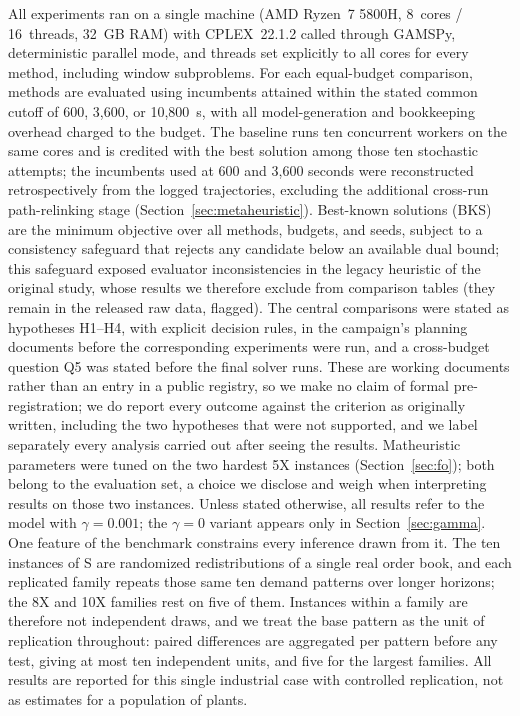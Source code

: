 All experiments ran on a single machine (AMD Ryzen~7 5800H, 8~cores /
16~threads, 32~GB RAM) with CPLEX~22.1.2 called through GAMSPy,
deterministic parallel mode, and threads set explicitly to all cores
for every method, including window subproblems. For each equal-budget
comparison, methods are evaluated using incumbents attained within the
stated common cutoff of 600, 3{,}600, or 10{,}800~s, with all
model-generation and bookkeeping overhead charged to the budget. The
\ILS{} baseline runs ten concurrent workers on the same cores and is
credited with the best solution among those ten stochastic attempts;
the incumbents used at 600 and 3{,}600 seconds were reconstructed
retrospectively from the logged trajectories, excluding the additional
cross-run path-relinking stage (Section~\ref{sec:metaheuristic}).
Best-known solutions (BKS) are
the minimum objective over all methods, budgets, and seeds, subject
to a consistency safeguard that rejects any candidate below an
available dual bound; this safeguard exposed evaluator
inconsistencies in the legacy heuristic of the original study, whose
results we therefore exclude from comparison tables (they remain in
the released raw data, flagged). The central comparisons were stated
as hypotheses H1--H4, with explicit decision rules, in the campaign's
planning documents before the corresponding experiments were run, and
a cross-budget question Q5 was stated before the final solver runs.
These are working documents rather than an entry in a public
registry, so we make no claim of formal pre-registration; we do report
every outcome against the criterion as originally written, including
the two hypotheses that were not supported, and we label separately
every analysis carried out after seeing the results. Matheuristic
parameters were tuned on the two hardest 5X instances
(Section~\ref{sec:fo}); both belong to the evaluation set, a choice
we disclose and weigh when interpreting results on those two
instances. Unless stated otherwise, all results refer to the model
with $\gamma=0.001$; the $\gamma=0$ variant appears only in
Section~\ref{sec:gamma}. One feature of the benchmark constrains
every inference drawn from it. The ten instances of S are randomized
redistributions of a single real order book, and each replicated
family repeats those same ten demand patterns over longer horizons;
the 8X and 10X families rest on five of them. Instances within a
family are therefore not independent draws, and we treat the base
pattern as the unit of replication throughout: paired differences are
aggregated per pattern before any test, giving at most ten
independent units, and five for the largest families. All results are
reported for this single industrial case with controlled replication,
not as estimates for a population of plants.

